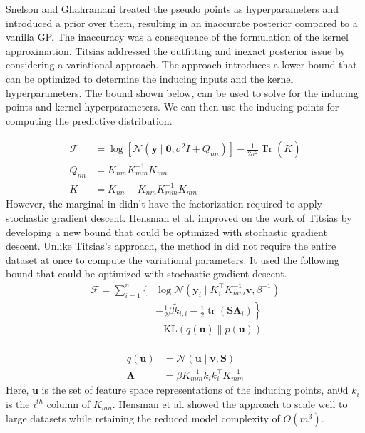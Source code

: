 \documentclass[letterpaper,11pt]{extarticle}
\begin{document}
Snelson and Ghahramani \cite{SnelsonEZ06} treated the pseudo points as hyperparameters and introduced a prior over them, resulting in an inaccurate posterior compared to a vanilla GP. The inaccuracy was a consequence of the formulation of the kernel approximation. Titsias \cite{Titsias09} addressed the outfitting and inexact posterior issue by considering a variational approach. The approach introduces a lower bound that can be optimized to determine the inducing inputs and the kernel hyperparameters. The bound shown below, can be used to solve for the inducing points and kernel hyperparameters. We can then use the inducing points for computing the predictive distribution. 


$$
\begin{aligned}
\mathcal{F} &= \log \left[\mathcal{N}\left(\mathbf{y} \mid \mathbf{0}, \sigma^{2} I+Q_{nn}\right)\right]-\frac{1}{2 \sigma^{2}} \operatorname{Tr}(\widetilde{K}) \\
Q_{nn} &= K_{nm} K^{-1}_{mm} K_{mn} \\
\widetilde{K} &=  K_{nn}-K_{nm} K^{-1}_{mm} K_{mn} 
\end{aligned}
$$
However, the marginal in \cite{Titsias09} didn't have the factorization required to apply stochastic gradient descent. Hensman et al. \cite{HensmanFL13} improved on the work of Titsias \cite{Titsias09} by developing a new bound that could be optimized with stochastic gradient descent. Unlike Titsias's approach, the method in \cite{HensmanFL13} did not require the entire dataset at once to compute the variational parameters. It used the following bound that could be optimized with stochastic gradient descent. 
$$
\begin{aligned}
\mathcal{F}=\sum_{i=1}^{n}\{& \log \mathcal{N}\left(\mathbf{y}_{i} \mid K_{i}^{\top} K_{mm}^{-1} \mathbf{v}, \beta^{-1}\right) \\
&\left.-\frac{1}{2} \beta \widetilde{k}_{i, i}-\frac{1}{2} \operatorname{tr}\left(\mathbf{S} \mathbf{\Lambda}_{i}\right)\right\} \\
&-\mathrm{KL}(q(\mathbf{u}) \| p(\mathbf{u})) \\
\end{aligned}
$$

$$
\begin{aligned}
q(\mathbf{u}) &= \mathcal{N} (\mathbf{u} \mid \mathbf{v}, \mathbf{S}) \\
\mathbf{\Lambda} &= \beta K^{-1}_{mm} k_i k_i^{\top} K^{-1}_{mm}
\end{aligned}
$$
Here, $\mathbf{u}$ is the set of feature space representations of the inducing points, an0d $k_i$ is the $i^{th}$ column of $K_{mn}$.  Hensman et al. showed the approach to scale well to large datasets while retaining the reduced model complexity of  $O(m^3)$. 
\end{document}
